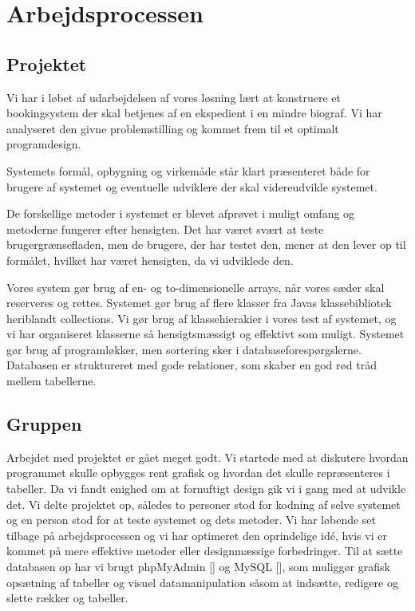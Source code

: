 \documentclass[final]{report}
\begin{document}
\chapter{Arbejdsprocessen}
\section{Projektet}
Vi har i løbet af udarbejdelsen af vores løsning lært at konstruere et bookingsystem der skal betjenes af en ekspedient i en mindre biograf. Vi har analyseret den givne problemstilling og kommet frem til et optimalt programdesign. 

Systemets formål, opbygning og virkemåde står klart præsenteret både for brugere af systemet og eventuelle udviklere der skal videreudvikle systemet. 

De forskellige metoder i systemet er blevet afprøvet i muligt omfang og metoderne fungerer efter hensigten. Det har været svært at teste brugergrænsefladen, men de brugere, der har testet den, mener at den lever op til formålet, hvilket har været hensigten, da vi udviklede den. 

Vores system gør brug af en- og to-dimensionelle arrays, når vores sæder skal reserveres og rettes. Systemet gør brug af flere klasser fra Javas klassebibliotek heriblandt collections. Vi gør brug af klassehierakier i vores test af systemet, og vi har organiseret klasserne så hensigtsmæssigt og effektivt som muligt. Systemet gør brug af programløkker, men sortering sker i databaseforespørgslerne. Databasen er struktureret med gode relationer, som skaber en god rød tråd mellem tabellerne. 

\section{Gruppen}
Arbejdet med projektet er gået meget godt. Vi startede med at diskutere hvordan programmet skulle opbygges rent grafisk og hvordan det skulle repræsenteres i tabeller. Da vi fandt enighed om at fornuftigt design gik vi i gang med at udvikle det. Vi delte projektet op, således to personer stod for kodning af selve systemet og en person stod for at teste systemet og dets metoder. Vi har løbende set tilbage på arbejdsprocessen og vi har optimeret den oprindelige idé, hvis vi er kommet på mere effektive metoder eller designmæssige forbedringer. Til at sætte databasen op har vi brugt phpMyAdmin [\cite{myAdmin}] og MySQL [\cite{javaF}], som muliggør grafisk opsætning af tabeller og visuel datamanipulation såsom at indsætte, redigere og slette rækker og tabeller.
\end{document}

